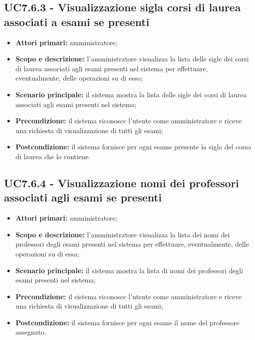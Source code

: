 \documentclass[AnalisiDeiRequisiti.tex]{subfiles}
\begin{document}
\subsection{UC7.6.3 - Visualizzazione sigla corsi di laurea associati a esami se presenti}
\begin{itemize}
	\item \textbf{Attori primari:} amministratore;
	\item \textbf{Scopo e descrizione:} l'amministratore visualizza la lista delle sigle dei corsi di laurea associati agli esami presenti nel sistema per effettuare, eventualmente, delle operazioni su di esso;
	\item \textbf{Scenario principale:} il sistema mostra la lista delle sigle dei corsi di laurea associati agli esami presenti nel sistema;
	\item \textbf{Precondizione:} il sistema riconosce l'utente come amministratore e riceve una richiesta di visualizzazione di tutti gli esami;  
	\item \textbf{Postcondizione:} il sistema fornisce per ogni esame presente la sigla del corso di laurea che lo contiene.
\end{itemize}
\subsection{UC7.6.4 - Visualizzazione nomi dei professori associati agli esami se presenti}
\begin{itemize}
	\item \textbf{Attori primari:} amministratore;
	\item \textbf{Scopo e descrizione:} l'amministratore visualizza la lista dei nomi dei professori degli esami presenti nel sistema per effettuare, eventualmente, delle operazioni su di essa;
	\item \textbf{Scenario principale:} il sistema mostra la lista di nomi dei professori degli esami presenti nel sistema;
	\item \textbf{Precondizione:} il sistema riconosce l'utente come amministratore e riceve una richiesta di visualizzazione di tutti gli esami; 
	\item \textbf{Postcondizione:} il sistema fornisce per ogni esame il nome del professore assegnato.
\end{itemize}
\end{document}
